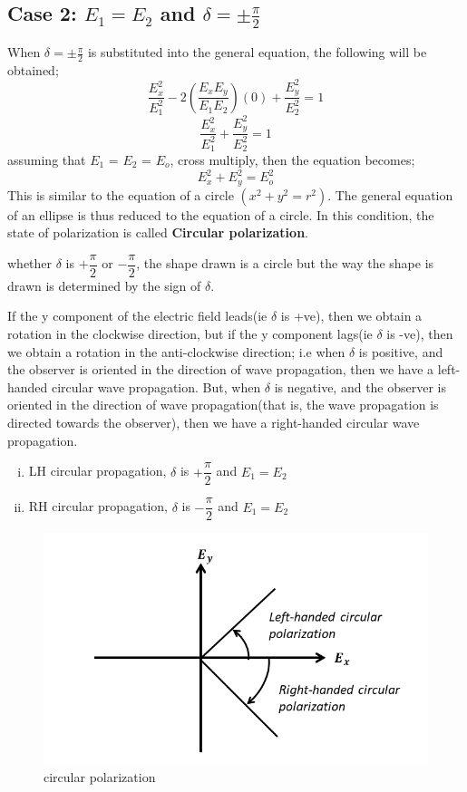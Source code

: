 \subsection{Case 2: $ E_1 = E_2 $ and $\delta = \pm \frac{\pi}{2}$}
When $\delta = \pm \frac{\pi}{2}$ is substituted into the general equation, the following will be obtained;
\begin{equation}
\frac{E_{x}^2}{E_{1}^2} -2(\frac{E_{x}E_{y}}{E_{1}E_{2}})(0) + \frac{E_{y}^2}{E_{2}^2} = 1
\end{equation}
\begin{equation}
\frac{E_{x}^2}{E_{1}^2} + \frac{E_{y}^2}{E_{2}^2} = 1
\end{equation}
assuming that $ E_1 $ = $ E_2 $ = $ E_{o} $, cross multiply, then the equation becomes;
\begin{equation}
{E_{x}^2} + {E_{y}^2} = {E_{o}^2}
\end{equation}
This is similar to the equation of a circle $(x^2 + y^2 = r^2)$. The general equation of an ellipse is thus reduced to the equation of a circle. In this condition, the state of polarization is called \textbf{Circular polarization}.

whether  $\delta$ is $+\dfrac{\pi}{2}$  or  $-\dfrac{\pi}{2} $, the shape drawn is a circle but the way the shape is drawn is determined by the sign of $\delta$.

If the y component of the electric field leads(ie $\delta$ is +ve), then we obtain a rotation in the clockwise direction, but if the y component lags(ie $\delta$ is -ve), then we obtain a rotation in the anti-clockwise direction; i.e when $\delta$ is positive, and the observer is oriented in the direction of wave propagation, then we have a left-handed circular wave propagation. But, when $\delta$ is negative, and the observer is oriented in the direction of wave propagation(that is, the wave propagation is directed towards the observer), then we have a right-handed circular wave propagation.
\begin{enumerate}[(i)]
\item LH circular propagation, $\delta$ is $ +\dfrac{\pi}{2}$ and $ E_1 = E_2$
\item RH circular propagation, $\delta$ is $-\dfrac{\pi}{2}$ and $ E_1 = E_2$ 
\end{enumerate}
\begin{figure}[h]
\centering
\includegraphics[width=1\linewidth]{graphics/circular_polarization}
\caption{circular polarization}
\end{figure} 


